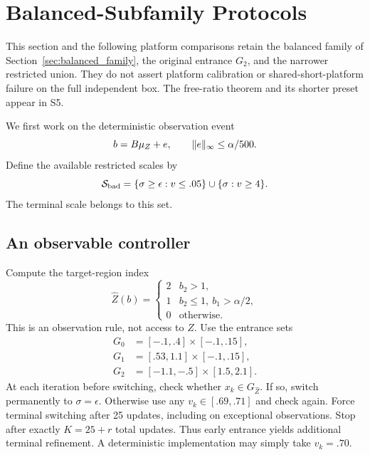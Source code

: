 \section{Balanced-Subfamily Protocols}
This section and the following platform comparisons retain the balanced family of Section~\ref{sec:balanced_family}, the original entrance $G_2$, and the narrower restricted union. They do not assert platform calibration or shared-short-platform failure on the full independent box. The free-ratio theorem and its shorter preset appear in S5.

We first work on the deterministic observation event
\begin{equation}\label{eq:event}
b=B\mu_Z+e,\qquad\lVert e\rVert_\infty\le\alpha/500.
\end{equation}
Define the available restricted scales by
\begin{equation}\label{eq:bad}
\mathcal S_{\mathrm{bad}}=\{\sigma\ge\epsilon:v\le.05\}\cup\{\sigma:v\ge4\}.
\end{equation}
The terminal scale belongs to this set.

\subsection{An observable controller}
Compute the target-region index
\begin{equation}\label{eq:classifier}
\widehat Z(b)=\begin{cases}
2&b_2>1,\\1&b_2\le1,\ b_1>\alpha/2,\\0&\text{otherwise}.
\end{cases}
\end{equation}
This is an observation rule, not access to $Z$. Use the entrance sets
\begin{align}
G_0&=[-.1,.4]\times[-.1,.15],\\
G_1&=[.53,1.1]\times[-.1,.15],\\
G_2&=[-1.1,-.5]\times[1.5,2.1].
\end{align}
At each iteration before switching, check whether $x_k\in G_{\widehat Z}$. If so, switch permanently to $\sigma=\epsilon$. Otherwise use any $v_k\in[.69,.71]$ and check again. Force terminal switching after 25 updates, including on exceptional observations. Stop after exactly $K=25+r$ total updates. Thus early entrance yields additional terminal refinement. A deterministic implementation may simply take $v_k=.70$.

